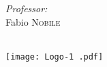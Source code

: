 \begin{titlepage}
\begin{minipage}{0.4\textwidth}
\begin{flushright}
    \emph{Professor:} \\
    Fabio \textsc{Nobile}\\
    \end{flushright}
    \end{minipage}\\[10cm]
    
    
    
    \texttt{[image: Logo-1 .pdf]}\\[1cm] 
     
    
    \vfill %
    
    \end{titlepage}